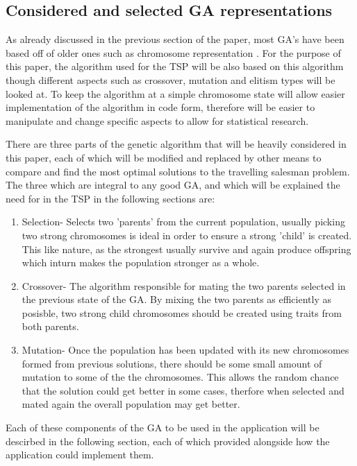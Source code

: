 \documentclass[article]{IEEEtran}
\begin{document}
\subsection{Considered and selected GA representations}
As already discussed in the previous section of the paper, most GA's have been based off of older ones such as chromosome representation \cite{5}. For the purpose of this paper, the algorithm used for the TSP will be also based on this algorithm though different aspects such as crossover, mutation and elitism types will be looked at. To keep the algorithm at a simple chromosome state will allow easier implementation of the algorithm in code form, therefore will be easier to manipulate and change specific aspects to allow for statistical research. \par
There are three parts of the genetic algorithm that will be heavily considered in this paper, each of which will be modified and replaced by other means to compare and find the most optimal solutions to the travelling salesman problem. The three which are integral to any good GA, and which will be explained the need for in the TSP in the following sections are:
\begin{enumerate}
\item Selection- Selects two 'parents' from the current population, usually picking two strong chromosomes is ideal in order to ensure a strong 'child' is created. This like nature, as the strongest usually survive and again produce offspring which inturn makes the population stronger as a whole.
\item Crossover- The algorithm responsible for mating the two parents selected in the previous state of the GA. By mixing the two parents as efficiently as posisble, two strong child chromosomes should be created using traits from both parents. 
\item Mutation- Once the population has been updated with its new chromosomes formed from previous solutions, there should be some small amount of mutation to some of the the chromosomes. This allows the random chance that the solution could get better in some cases, therfore when selected and mated again the overall population may get better.
\end{enumerate}
Each of these components of the GA to be used in the application will be descirbed in the following section, each of which provided alongside how the application could implement them.
\end{document}
